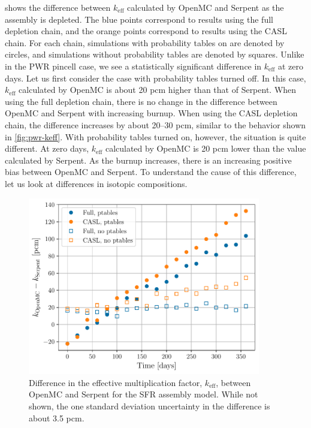 \documentclass[3p,authoryear]{elsarticle}
\begin{document}
 shows the difference between $k_\text{eff}$ calculated by
OpenMC and Serpent as the assembly is depleted. The blue points correspond to
results using the full depletion chain, and the orange points correspond to
results using the CASL chain. For each chain, simulations with probability
tables on are denoted by circles, and simulations without probability tables are
denoted by squares. Unlike in the PWR pincell case, we see a statistically
significant difference in $k_\text{eff}$ at zero days. Let us first consider the
case with probability tables turned off. In this case, $k_\text{eff}$ calculated
by OpenMC is about 20 pcm higher than that of Serpent. When using the full
depletion chain, there is no change in the difference between OpenMC and Serpent
with increasing burnup. When using the CASL depletion chain, the difference
increases by about 20--30 pcm, similar to the behavior shown in
\cref{fig:pwr-keff}. With probability tables turned on, however, the situation
is quite different. At zero days, $k_\text{eff}$ calculated by OpenMC is 20 pcm
lower than the value calculated by Serpent. As the burnup increases, there is an
increasing positive bias between OpenMC and Serpent. To understand the cause of
this difference, let us look at differences in isotopic compositions.
\begin{figure}[H]
  \centering
  \includegraphics[width=4in]{figures/sfr_keff.pdf}
  \caption{Difference in the effective multiplication factor, $k_\text{eff}$,
  between OpenMC and Serpent for the SFR assembly model. While not shown, the one
  standard deviation uncertainty in the difference is about 3.5 pcm.}
  \label{fig:sfr-keff}
\end{figure}
\end{document}
